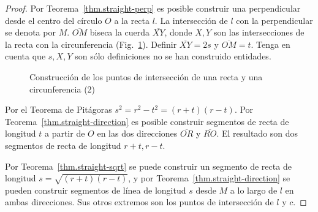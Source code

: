 \begin{proof}
Por Teorema~\ref{thm.straight-perp} es posible construir una perpendicular desde el centro del círculo $O$ a la recta $l$. La intersección de $l$ con la perpendicular se denota por $M$. $\overline{OM}$ biseca la cuerda $\overline{XY}$, donde $X, Y$ son las intersecciones de la recta con la circunferencia (Fig.~\ref{f.se-line-circle2}). Definir $\overline{XY}=2s$ y $\overline{OM}=t$. Tenga en cuenta que $s,X,Y$ son sólo definiciones no se han construido entidades.
\begin{figure}[b]
\begin{center}
\end{center}
\caption{Construcción de los puntos de intersección de una recta y una circunferencia (2)}\label{f.se-line-circle2}
\end{figure}

Por el Teorema de Pitágoras $s^2=r^2-t^2=(r+t)(r-t)$. Por Teorema~\ref{thm.straight-direction} es posible construir segmentos de recta de longitud $t$ a partir de $O$ en las dos direcciones $\overline{OR}$ y $\overline{RO}$. El resultado son dos segmentos de recta de longitud $r+t,r-t$.

Por Teorema~\ref{thm.straight-sqrt} se puede construir un segmento de recta de longitud $s=\sqrt{(r+t)(r-t)}$, y por Teorema~\ref{thm.straight-direction} se pueden construir segmentos de línea de longitud $s$ desde $M$ a lo largo de $l$ en ambas direcciones. Sus otros extremos son los puntos de intersección de $l$ y $c$.
\end{proof}


